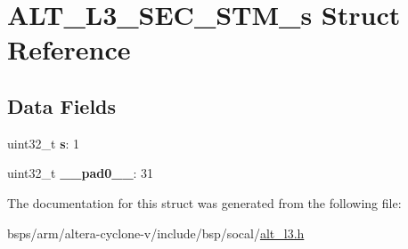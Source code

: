 \hypertarget{structALT__L3__SEC__STM__s}{}\section{A\+L\+T\+\_\+\+L3\+\_\+\+S\+E\+C\+\_\+\+S\+T\+M\+\_\+s Struct Reference}
\label{structALT__L3__SEC__STM__s}
\subsection*{Data Fields}
\begin{DoxyCompactItemize}
\item 
\mbox{\label{structALT__L3__SEC__STM__s_a85b35b6dca583a8a9aae2e479bdbd2fd}} 
uint32\+\_\+t {\bfseries s}\+: 1
\item 
\mbox{\label{structALT__L3__SEC__STM__s_ab9fb799211ce5723f8a692147a249cf9}} 
uint32\+\_\+t {\bfseries \+\_\+\+\_\+pad0\+\_\+\+\_\+}\+: 31
\end{DoxyCompactItemize}


The documentation for this struct was generated from the following file\+:\begin{DoxyCompactItemize}
\item 
bsps/arm/altera-\/cyclone-\/v/include/bsp/socal/\mbox{\hyperlink{alt__l3_8h}{alt\+\_\+l3.\+h}}\end{DoxyCompactItemize}
